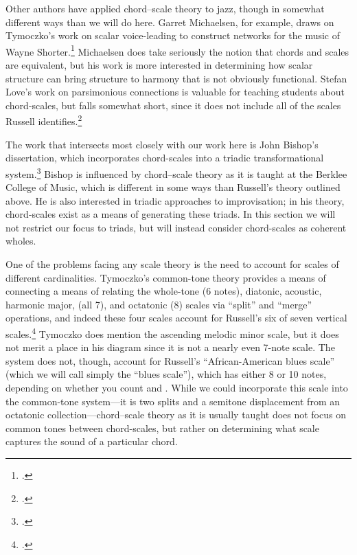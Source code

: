 Other authors have applied chord--scale theory to jazz, though in somewhat
different ways than we will do here. Garret Michaelsen, for example, draws on
Tymoczko's work on scalar voice-leading to construct networks for the music of
Wayne Shorter.\footcite{michaelsen:2012} Michaelsen does take seriously the
notion that chords and scales are equivalent, but his work is more interested
in determining how scalar structure can bring structure to harmony that is not
obviously functional. Stefan Love's work on parsimonious connections is
valuable for teaching students about chord-scales, but falls somewhat short,
since it does not include all of the scales Russell
identifies.\footcite{love:2009}

The work that intersects most closely with our work here is John Bishop's
dissertation, which incorporates chord-scales into a triadic transformational
system.\footcite{bishop:2012} Bishop is influenced by chord--scale theory as
it is taught at the Berklee College of Music, which is different in some ways
than Russell's theory outlined above. He is also interested in
triadic approaches to improvisation; in his theory, chord-scales exist as a
means of generating these triads. In this section we will not
restrict our focus to triads, but will instead consider chord-scales as
coherent wholes.

One of the problems facing any scale theory is the need to account for scales
of different cardinalities. Tymoczko's common-tone theory provides a means of
connecting a means of relating the whole-tone (6 notes), diatonic, acoustic,
harmonic major, (all 7), and octatonic (8) scales via ``split'' and ``merge''
operations, and indeed these four scales account for Russell's six of seven
vertical scales.\footcite[134--35]{tymoczko:2011} Tymoczko does mention the
ascending melodic minor scale, but it does not merit a place in his diagram
since it is not a nearly even 7-note scale. The system does not, though,
account for Russell's ``African-American blues scale'' (which we will call
simply the ``blues scale''), which has either 8 or 10 notes, depending on
whether you count  and \nat{}. While we could incorporate this scale into
the common-tone system---it is two splits and a semitone displacement from an
octatonic collection---chord--scale theory as it is usually taught does not
focus on common tones between chord-scales, but rather on determining what
scale captures the sound of a particular chord.


